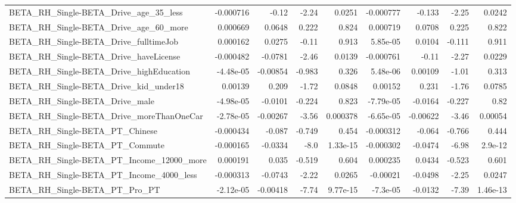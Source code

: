 \begin{tabular}{lrrrrrrrr}
BETA\_RH\_Single-BETA\_Drive\_age\_35\_less              &   -0.000716 &        -0.12 &     -2.24 &   0.0251 &  -0.000777 &      -0.133 &        -2.25 &        0.0242 \\
BETA\_RH\_Single-BETA\_Drive\_age\_60\_more              &    0.000669 &       0.0648 &     0.222 &    0.824 &   0.000719 &      0.0708 &        0.225 &         0.822 \\
BETA\_RH\_Single-BETA\_Drive\_fulltimeJob              &    0.000162 &       0.0275 &     -0.11 &    0.913 &   5.85e-05 &      0.0104 &       -0.111 &         0.911 \\
BETA\_RH\_Single-BETA\_Drive\_haveLicense              &   -0.000482 &      -0.0781 &     -2.46 &   0.0139 &  -0.000761 &       -0.11 &        -2.27 &        0.0229 \\
BETA\_RH\_Single-BETA\_Drive\_highEducation            &   -4.48e-05 &     -0.00854 &    -0.983 &    0.326 &   5.48e-06 &     0.00109 &        -1.01 &         0.313 \\
BETA\_RH\_Single-BETA\_Drive\_kid\_under18              &     0.00139 &        0.209 &     -1.72 &   0.0848 &    0.00152 &       0.231 &        -1.76 &        0.0785 \\
BETA\_RH\_Single-BETA\_Drive\_male                     &   -4.98e-05 &      -0.0101 &    -0.224 &    0.823 &  -7.79e-05 &     -0.0164 &       -0.227 &          0.82 \\
BETA\_RH\_Single-BETA\_Drive\_moreThanOneCar           &   -2.78e-05 &     -0.00267 &     -3.56 & 0.000378 &  -6.65e-05 &    -0.00622 &        -3.46 &       0.00054 \\
BETA\_RH\_Single-BETA\_PT\_Chinese                     &   -0.000434 &       -0.087 &    -0.749 &    0.454 &  -0.000312 &      -0.064 &       -0.766 &         0.444 \\
BETA\_RH\_Single-BETA\_PT\_Commute                     &   -0.000165 &      -0.0334 &      -8.0 & 1.33e-15 &  -0.000302 &     -0.0474 &        -6.98 &       2.9e-12 \\
BETA\_RH\_Single-BETA\_PT\_Income\_12000\_more           &    0.000191 &        0.035 &    -0.519 &    0.604 &   0.000235 &      0.0434 &       -0.523 &         0.601 \\
BETA\_RH\_Single-BETA\_PT\_Income\_4000\_less            &   -0.000313 &      -0.0743 &     -2.22 &   0.0265 &   -0.00021 &     -0.0498 &        -2.25 &        0.0247 \\
BETA\_RH\_Single-BETA\_PT\_Pro\_PT                      &   -2.12e-05 &     -0.00418 &     -7.74 & 9.77e-15 &   -7.3e-05 &     -0.0132 &        -7.39 &      1.46e-13 \\

\end{tabular}
